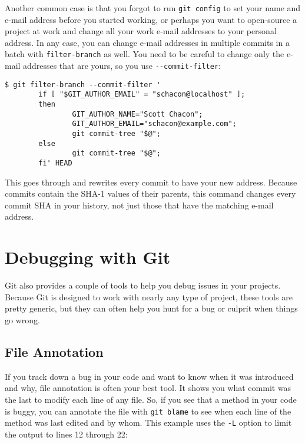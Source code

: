 \documentclass[a4paper]{book}
\begin{document}
Another common case is that you forgot to run \texttt{git config} to set your name and e-mail address before you started working, or perhaps you want to open-source a project at work and change all your work e-mail addresses to your personal address. In any case, you can change e-mail addresses in multiple commits in a batch with \texttt{filter-branch} as well. You need to be careful to change only the e-mail addresses that are yours, so you use \texttt{-{}-commit-filter}:

\begin{shaded}\begin{verbatim}
$ git filter-branch --commit-filter '
        if [ "$GIT_AUTHOR_EMAIL" = "schacon@localhost" ];
        then
                GIT_AUTHOR_NAME="Scott Chacon";
                GIT_AUTHOR_EMAIL="schacon@example.com";
                git commit-tree "$@";
        else
                git commit-tree "$@";
        fi' HEAD
\end{verbatim}\end{shaded}

This goes through and rewrites every commit to have your new address. Because commits contain the SHA-1 values of their parents, this command changes every commit SHA in your history, not just those that have the matching e-mail address.

\section{Debugging with Git}\label{debugging-with-git}

Git also provides a couple of tools to help you debug issues in your projects. Because Git is designed to work with nearly any type of project, these tools are pretty generic, but they can often help you hunt for a bug or culprit when things go wrong.

\subsection{File Annotation}\label{file-annotation}

If you track down a bug in your code and want to know when it was introduced and why, file annotation is often your best tool. It shows you what commit was the last to modify each line of any file. So, if you see that a method in your code is buggy, you can annotate the file with \texttt{git blame} to see when each line of the method was last edited and by whom. This example uses the \texttt{-L} option to limit the output to lines 12 through 22:
\end{document}
